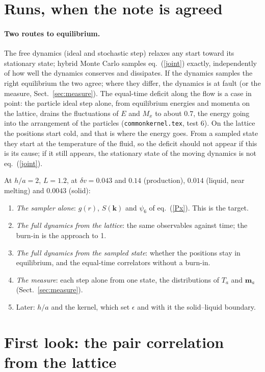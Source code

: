 \documentclass[11pt,aps,preprint,nofootinbib,superscriptaddress,tightenlines]{revtex4-2}
\def\Eq#1{eq.~(\ref{#1})}
\def\Sect#1{Sect.~\ref{#1}}
\let\oldparagraph\paragraph
\renewcommand{\paragraph}{\par\bigskip\oldparagraph}
\begin{document}
\section{Runs, when the note is agreed}
\label{sec:runs}

\paragraph{Two routes to equilibrium.}  The free dynamics (ideal and stochastic step) relaxes any start toward its
stationary state; hybrid Monte Carlo samples \Eq{joint} exactly, independently of how well the dynamics conserves and
dissipates.  If the dynamics samples the right equilibrium the two agree; where they differ, the dynamics is at fault (or
the measure, \Sect{sec:measure}).  The equal-time deficit along the flow is a case in point: the particle ideal step alone,
from equilibrium energies and momenta on the lattice, drains the fluctuations of $E$ and $M_x$ to about $0.7$, the energy
going into the arrangement of the particles (\texttt{commonkernel.tex}, test 6).  On the lattice the positions start
cold, and that is where the energy goes.  From a sampled state they start at the temperature of the fluid, so the deficit
should not appear if this is its cause; if it still appears, the stationary state of the moving dynamics is not
\Eq{joint}.

At $h/a=2$, $L=1.2$, at $\delta v=0.043$ and $0.14$ (production), $0.014$ (liquid, near melting) and $0.0043$ (solid):
\begin{enumerate}
\item \emph{The sampler alone}: $g(r)$, $S(\bm k)$ and $\psi_6$ of \Eq{Px}.  This is the target.
\item \emph{The full dynamics from the lattice}: the same observables against time; the burn-in is the approach to 1.
\item \emph{The full dynamics from the sampled state}: whether the positions stay in equilibrium, and the equal-time
  correlators without a burn-in.
\item \emph{The measure}: each step alone from one state, the distributions of $T_a$ and $\bm m_a$ (\Sect{sec:measure}).
\item Later: $h/a$ and the kernel, which set $\epsilon$ and with it the solid--liquid boundary.
\end{enumerate}

\section{First look: the pair correlation from the lattice}
\label{sec:firstlook}
\end{document}
